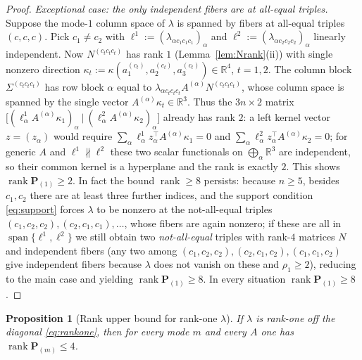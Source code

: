 \documentclass[12pt]{article}
\DeclareMathOperator{\rank}{rank}
\DeclareMathOperator{\spanop}{span}
\newcommand{\bR}{\mathbb{R}}
\newtheorem{proposition}{Proposition}
\theoremstyle{definition}
\begin{document}
\begin{proof}
\emph{Exceptional case: the only independent fibers are at all-equal triples.}
Suppose the mode-$1$ column space of $\lambda$ is spanned by fibers at all-equal
triples $(c,c,c)$.  Pick $c_1\neq c_2$ with $\ell^{1}:=(\lambda_{\alpha c_1c_1c_1})_\alpha$
and $\ell^{2}:=(\lambda_{\alpha c_2c_2c_2})_\alpha$ linearly independent.  Now
$N^{(c_tc_tc_t)}$ has rank $1$ (Lemma~\ref{lem:Nrank}(ii)) with single nonzero
direction $\kappa_t:=\kappa(a^{(c_t)}_1,a^{(c_t)}_2,a^{(c_t)}_3)\in\bR^4$, $t=1,2$.
The column block $\Sigma^{(c_tc_tc_t)}$ has row block $\alpha$ equal to
$\lambda_{\alpha c_tc_tc_t}A^{(\alpha)}N^{(c_tc_tc_t)}$, whose column space is spanned
by the single vector $A^{(\alpha)}\kappa_t\in\bR^3$.  Thus the $3n\times2$ matrix
$\bigl[(\ell^1_\alpha A^{(\alpha)}\kappa_1)_\alpha\ |\ (\ell^2_\alpha A^{(\alpha)}\kappa_2)_\alpha\bigr]$
already has rank $2$: a left kernel vector $z=(z_\alpha)$ would require
$\sum_\alpha\ell^1_\alpha z_\alpha^\top A^{(\alpha)}\kappa_1=0$ and
$\sum_\alpha\ell^2_\alpha z_\alpha^\top A^{(\alpha)}\kappa_2=0$; for generic $A$ and
$\ell^1\not\parallel\ell^2$ these two scalar functionals on $\bigoplus_\alpha\bR^3$
are independent, so their common kernel is a hyperplane and the rank is exactly $2$.
This shows $\rank\mathbf P_{(1)}\ge2$.  In fact the bound $\rank\ge8$ persists:
because $n\ge5$, besides $c_1,c_2$ there are at least three further indices, and the
support condition \eqref{eq:support} forces $\lambda$ to be nonzero at the
not-all-equal triples $(c_1,c_2,c_2),(c_2,c_1,c_1),\dots$, whose fibers are again
nonzero; if these are all in $\spanop\{\ell^1,\ell^2\}$ we still obtain two
\emph{not-all-equal} triples with rank-$4$ matrices $N$ and independent fibers
(any two among $(c_1,c_2,c_2),(c_2,c_1,c_2),(c_1,c_1,c_2)$ give independent
fibers because $\lambda$ does not vanish on these and $\rho_1\ge2$), reducing to the
main case and yielding $\rank\mathbf P_{(1)}\ge8$.  In every situation
$\rank\mathbf P_{(1)}\ge8$.
\end{proof}

\begin{proposition}[Rank upper bound for rank-one $\lambda$]\label{prop:upper}
If $\lambda$ is rank-one off the diagonal \eqref{eq:rankone}, then for every mode
$m$ and every $A$ one has $\rank\mathbf P_{(m)}\le 4$.
\end{proposition}
\end{document}

